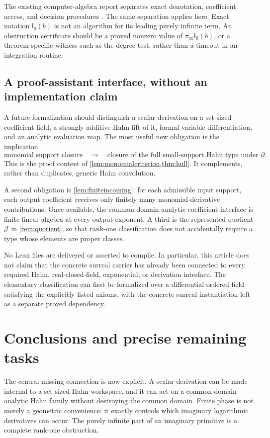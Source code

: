 \documentclass[11pt,a4paper]{article}
\theoremstyle{definition}
\newcommand{\D}{\partial}
\newcommand{\JJ}{\mathcal J}
\newcommand{\Ip}{\mathsf I_0}
\newcommand{\pinf}{\pi_{\infty}}
\numberwithin{equation}{section}
\begin{document}
The existing computer-algebra report separates exact denotation,
coefficient access, and decision procedures \cite{RepoCAS}. The same
separation applies here. Exact notation $\Ip(b)$ is not an algorithm for
its leading purely infinite term. An obstruction certificate should be a
proved nonzero value of $\pinf\Ip(b)$, or a theorem-specific witness such
as the degree test, rather than a timeout in an integration routine.

\subsection{A proof-assistant interface, without an implementation claim}
A future formalization should distinguish a scalar derivation on a
set-sized coefficient field, a strongly additive Hahn lift of it, formal
variable differentiation, and an analytic evaluation map. The most useful
new obligation is the implication
\[
 \text{monomial support closure}
 \quad\Longrightarrow\quad
 \text{closure of the full small-support Hahn type under }\D.
\]
This is the proof content of \cref{lem:monomialcriterion,thm:hull}.
It complements, rather than duplicates, generic Hahn convolution.

A second obligation is \cref{lem:finiteincoming}: for each admissible
input support, each output coefficient receives only finitely many
monomial-derivative contributions. Once available, the common-domain
analytic coefficient interface is finite linear algebra at every output
exponent. A third is the represented quotient $\JJ$ in
\cref{rem:quotient}, so that rank-one classification does not accidentally
require a type whose elements are proper classes.

No Lean files are delivered or asserted to compile. In particular, this
article does not claim that the concrete surreal carrier has already been
connected to every required Hahn, real-closed-field, exponential, or
derivation interface. The elementary classification can first be
formalized over a differential ordered field satisfying the explicitly
listed axioms, with the concrete surreal instantiation left as a separate
proved dependency.

\section{Conclusions and precise remaining tasks}\label{sec:conclusion}

The central missing connection is now explicit. A scalar derivation can
be made internal to a set-sized Hahn workspace, and it can act on a
common-domain analytic Hahn family without destroying the common domain.
Finite phase is not merely a geometric convenience: it exactly controls
which imaginary logarithmic derivatives can occur. The purely infinite
part of an imaginary primitive is a complete rank-one obstruction.
\end{document}
